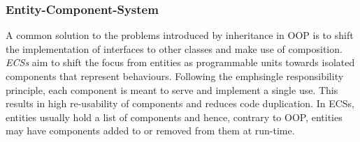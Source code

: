 \subsubsection{Entity-Component-System}
A common solution to the problems introduced by inheritance in \ac{OOP} is to shift the implementation of interfaces to other classes and make use of composition. \emph{\acp{ECS}} aim to shift the focus from entities as programmable units towards isolated components that represent behaviours. Following the emph{single responsibility principle}, each component is meant to serve and implement a single use. This results in high re-usability of components and reduces code duplication. In \acp{ECS}, entities usually hold a list of components and hence, contrary to \ac{OOP}, entities may have components added to or removed from them at run-time. 